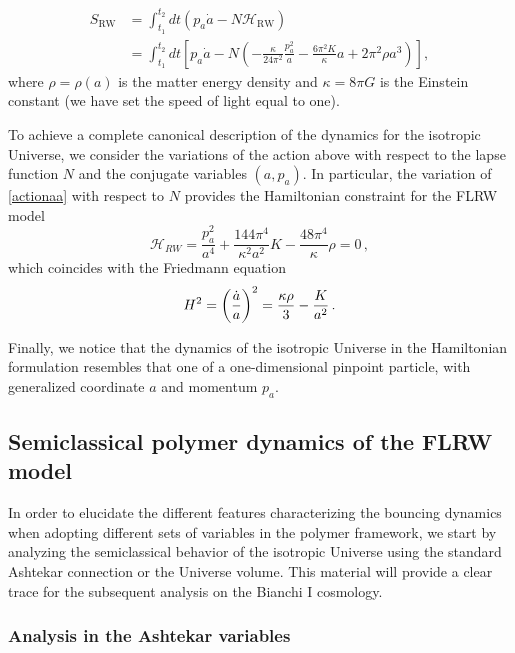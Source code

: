 \documentclass[aps,prd,twocolumn,nofootinbib,superscriptaddress]{revtex4-2}
\begin{document}
\begin{equation}
	\begin{aligned}
	\label{actionaa}
	S_{\mathrm{RW}} &=\int_{t_{1}}^{t_{2}} d t\left(p_{a} \dot{a}-N \mathcal{H}_{\mathrm{RW}}\right) \\
	&=\int_{t_{1}}^{t_{2}} d t\left[p_{a} \dot{a}-N\left(-\frac{\kappa}{24 \pi^{2}} \frac{p_{a}^{2}}{a}-\frac{6 \pi^{2} K}{\kappa} a+2 \pi^{2} \rho a^{3}\right)\right],
    \end{aligned}
\end{equation}
where $\rho=\rho(a)$ is the matter energy density and $\kappa=8\pi G$ is the Einstein constant (we have set the speed of light equal to one).

To achieve a complete canonical description of the dynamics for the isotropic Universe, we consider the variations of the action above with respect to the lapse function $N$ and the conjugate variables $(a,p_{a})$. In particular, the variation of \eqref{actionaa} with respect to $N$ provides the Hamiltonian constraint for the FLRW model
\begin{equation}
	\label{HFRW}
	\mathcal{H}_{RW}=\frac{p_{a}^{2}}{a^{4}}+\frac{144 \pi^{4}}{\kappa^{2} a^{2}} K-\frac{48 \pi^{4}}{\kappa} \rho=0\,,
\end{equation}
which coincides with the Friedmann equation
\begin{equation}
	\label{eqn:Fried}
	H^{2}=\bigg({\dot a\over a}\bigg)^{2}={\kappa\rho\over 3}-{K\over a^{2}}\,.
\end{equation}
	
Finally, we notice that the dynamics of the isotropic Universe in the Hamiltonian formulation resembles that one of a one-dimensional pinpoint particle, with generalized coordinate $a$ and momentum $p_{a}$.
		
\subsection{Semiclassical polymer dynamics of the FLRW model\label{FRW}}

In order to elucidate the different features characterizing the bouncing dynamics when adopting different sets of variables in the polymer framework, we start by analyzing the semiclassical behavior of the isotropic Universe using the standard Ashtekar connection or the Universe volume. This material will provide a clear trace for the subsequent analysis on the Bianchi I cosmology.

\subsubsection{\small Analysis in the Ashtekar variables\label{FRWash}}
\end{document}
